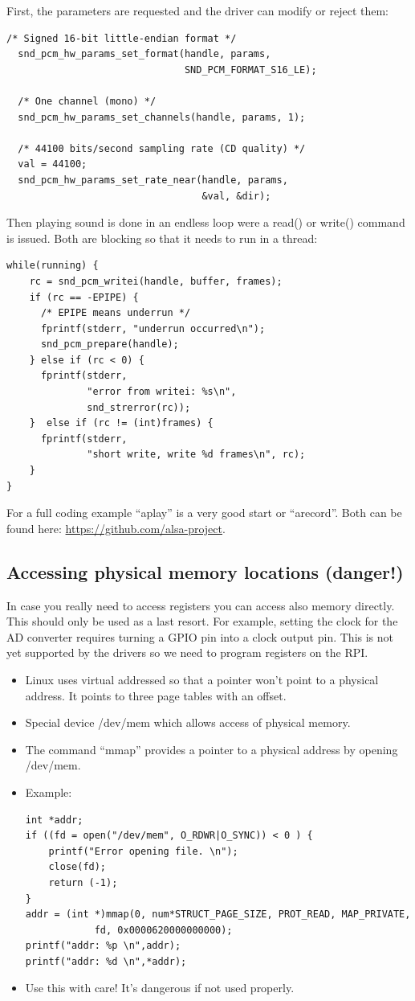 \documentclass[12pt]{report}
\begin{document}
First, the parameters are requested and the driver can modify or
reject them:
\begin{verbatim}
/* Signed 16-bit little-endian format */
  snd_pcm_hw_params_set_format(handle, params,
                               SND_PCM_FORMAT_S16_LE);

  /* One channel (mono) */
  snd_pcm_hw_params_set_channels(handle, params, 1);

  /* 44100 bits/second sampling rate (CD quality) */
  val = 44100;
  snd_pcm_hw_params_set_rate_near(handle, params,
                                  &val, &dir);
\end{verbatim}

Then playing sound is done in an endless loop were a read()
or write() command is issued. Both are blocking so that
it needs to run in a thread:

\begin{verbatim}
while(running) {
    rc = snd_pcm_writei(handle, buffer, frames);
    if (rc == -EPIPE) {
      /* EPIPE means underrun */
      fprintf(stderr, "underrun occurred\n");
      snd_pcm_prepare(handle);
    } else if (rc < 0) {
      fprintf(stderr,
              "error from writei: %s\n",
              snd_strerror(rc));
    }  else if (rc != (int)frames) {
      fprintf(stderr,
              "short write, write %d frames\n", rc);
    }
}
\end{verbatim}

For a full coding example ``aplay'' is a very
good start or ``arecord''. Both can be found here:
\url{https://github.com/alsa-project}.




\subsection{Accessing physical memory locations (danger!)}
In case you really need to access registers you can access
also memory directly. This should only be used as a last resort.
For example, setting the clock for the AD converter requires
turning a GPIO pin into a clock output pin. This is not yet
supported by the drivers so we need to program registers
on the RPI.
\begin{itemize}
\item Linux uses virtual addressed so that a pointer won't
point to a physical address. It points to three page
tables with an offset.
\item Special device /dev/mem which allows access of physical
memory.
\item The command ``mmap'' provides a pointer to a physical
address by opening /dev/mem.
\item Example:
\begin{verbatim}
int *addr;
if ((fd = open("/dev/mem", O_RDWR|O_SYNC)) < 0 ) {
    printf("Error opening file. \n");
    close(fd);
    return (-1);
}
addr = (int *)mmap(0, num*STRUCT_PAGE_SIZE, PROT_READ, MAP_PRIVATE,
            fd, 0x0000620000000000);
printf("addr: %p \n",addr);
printf("addr: %d \n",*addr);
\end{verbatim}
\item Use this with care! It's dangerous if not used properly.
\end{itemize}
\end{document}
